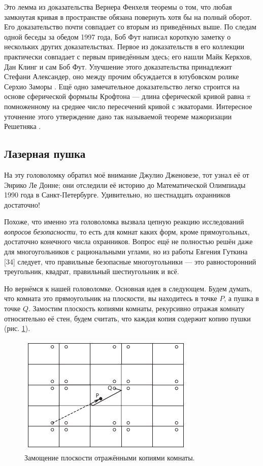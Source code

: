 \begin{addedbytheeditors}
Это лемма из доказательства Вернера Фенхеля \cite[Satz I$'$]{fenchel} теоремы о том, что любая замкнутая кривая в пространстве обязана повернуть хотя бы на полный оборот.
Его доказательство почти совпадает со вторым из приведённых выше.
По следам одной беседы за обедом 1997 года, Боб Фут написал короткую заметку о нескольких других доказательствах.
Первое из доказательств в его коллекции практически совпадает с первым приведённым здесь;
его нашли Майк Керкхов, Дан Клинг и сам Боб Фут.
Улучшение этого доказательства принадлежит Стефани Александер, оно между прочим обсуждается в ютубовском ролике Серхио Заморы \cite{zamora}.
Ещё одно замечательное доказательство легко строится на основе сферической формылы Крофтона --- длина сферической кривой равна $\pi$ помноженному на среднее число пересечений кривой с экваторами.
Интересное уточнение этого утверждение дано так называемой теореме мажоризации Решетняка \cite{reshetnyak}.
\end{addedbytheeditors}

\subsection*{Лазерная пушка}

На эту головоломку обратил моё внимание Джулио Дженовезе, тот узнал её от Энрико Ле Донне;
они отследили её историю до Математической Олимпиады 1990 года в Санкт-Петербурге.
Удивительно, но шестнадцать охранников достаточно!

Похоже, что именно эта головоломка вызвала цепную реакцию исследований \emph{вопросов безопасности}, то есть для комнат каких форм, кроме прямоугольных, достаточно конечного числа охранников.
Вопрос ещё не полностью решён даже для многоугольников с рациональными углами, но из работы Евгения Гуткина [34] следует, что правильные безопасные многоугольники --- это равносторонний треугольник, квадрат, правильный шестиугольник и всё.

Но вернёмся к нашей головоломке.
Основная идея в следующем.
Будем думать, что комната это прямоугольник на плоскости, вы находитесь в точке $P$, а пушка в точке $Q$.
Замостим плоскость копиями комнаты, рекурсивно отражая комнату относительно её стен, будем считать, что каждая копия содержит копию пушки (рис. \ref{pic:room1}).

\begin{figure}[h!]
\centering
\includegraphics[scale=1]{pics/room1}
\caption{Замощение плоскости отражёнными копиями комнаты.}
\label{pic:room1}
\end{figure}

